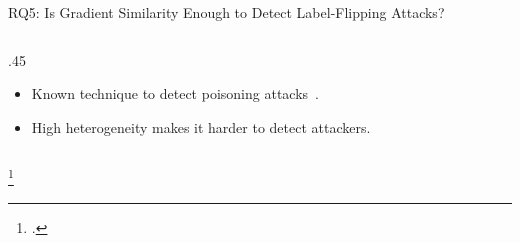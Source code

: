 

\begin{frame}{RQ5: Is Gradient Similarity Enough to Detect Label-Flipping Attacks?}

  \begin{columns}
    \begin{column}{.45\textwidth}
      \begin{itemize}[<+->]
        \item Known technique to detect poisoning attacks~\autocite{tolpegin_DataPoisoningAttacks_2020}.
        \item High heterogeneity makes it harder to detect attackers.
      \end{itemize}
    \end{column}

  \end{columns}

  \footcite*{tolpegin_DataPoisoningAttacks_2020}

\end{frame}

